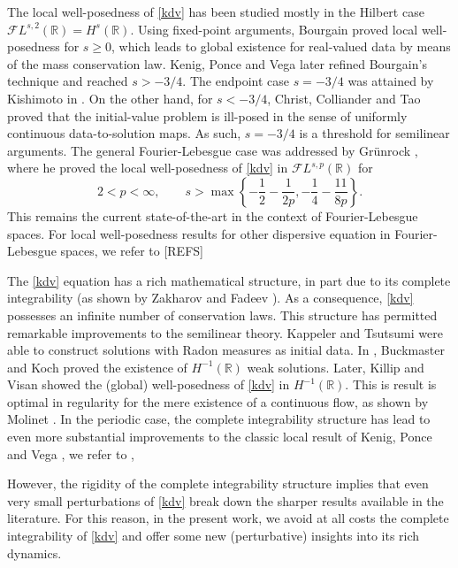 \documentclass[%
11pt,  reqno]{amsart}
\newcommand{\5}{\textup{V}}
\theoremstyle{remark}
\newcommand{\R}{\mathbb{R}}
\numberwithin{equation}{section}
\numberwithin{theorem}{section}
\begin{document}
	The local well-posedness of \eqref{kdv} has been studied mostly in the Hilbert case $\mathcal{F}L^{s,2}(\R)=H^s(\R)$. Using fixed-point arguments, Bourgain \cite{bourg2} proved local well-posedness for $s\ge 0$, which leads to global existence for real-valued data by means of the mass conservation law. Kenig, Ponce and Vega \cite{kpv_bilin} later refined Bourgain's technique and reached $s>-3/4$. The endpoint case $s=-3/4$ was attained by Kishimoto in \cite{Kishimoto_lwp_crit}. On the other hand, for $s<-3/4$, Christ, Colliander and Tao \cite{CCT_ill} proved that the initial-value problem is ill-posed in the sense of uniformly continuous data-to-solution maps. As such, $s=-3/4$ is a threshold for semilinear arguments. The general Fourier-Lebesgue case was addressed by Grünrock \cite{Grunrock_ldv_hier}, where he proved the local well-posedness of \eqref{kdv} in $\mathcal{F}L^{s,p}(\R)$ for
	\begin{equation}
		2<p<\infty,\qquad s>\max\left\{ -\frac12 - \frac{1}{2p}, -\frac14 - \frac{11}{8p} \right\}.\label{eq:sp_grunrock}
	\end{equation}
	This remains the current state-of-the-art in the context of Fourier-Lebesgue spaces. For local well-posedness results for other dispersive equation in Fourier-Lebesgue spaces, we refer to \cite{adams, Chapouto_FL_mkdv, Grunrock_mkdv} [REFS]
	
	\medskip
	
	The \eqref{kdv} equation has a rich mathematical structure, in part due to its complete integrability (as shown by  Zakharov and Fadeev \cite{ZakharovFadeev}). As a consequence, \eqref{kdv} possesses an infinite number of conservation laws. This structure has permitted remarkable improvements to the semilinear theory. Kappeler \cite{Kappeler_rough} and Tsutsumi \cite{Tsutsumi_kdv_measures} were able to construct solutions with Radon measures as initial data. In \cite{BuckmasterKoch}, Buckmaster and Koch proved the existence of $H^{-1}(\R)$ weak solutions. Later, Killip and Visan \cite{KillipVisan_kdv} showed the (global) well-posedness of \eqref{kdv} in $H^{-1}(\R)$. This is result is optimal in regularity for the mere existence  of a continuous flow, as shown by Molinet \cite{Molinet_ill_line}. In the periodic case, the complete integrability structure has lead to even more substantial improvements to the classic local result of Kenig, Ponce and Vega \cite{kpv_bilin}, we refer to \cite{KT06, KMMT16, KappelerMolnar18},
	
	However, the rigidity of the complete integrability structure implies that even very small perturbations of \eqref{kdv} break down the sharper results available in the literature. For this reason, in the present work, we avoid at all costs the complete integrability of \eqref{kdv} and offer some new (perturbative) insights into its rich dynamics.
	
\end{document}
